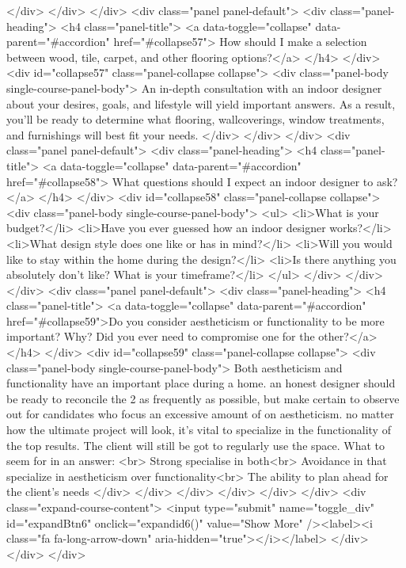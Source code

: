 {</div>
</div>
</div>
<div class="panel panel-default">
<div class="panel-heading">
<h4 class="panel-title">
<a data-toggle="collapse" data-parent="#accordion" href="#collapse57"> How should I make a selection between wood, tile, carpet, and other flooring options?</a>
</h4>
</div>
<div id="collapse57" class="panel-collapse collapse">
<div class="panel-body single-course-panel-body">
An in-depth consultation with an indoor designer about your desires, goals, and lifestyle will yield important answers. As a result, you'll be ready to determine what flooring, wallcoverings, window treatments, and furnishings will best fit your needs.
</div>
</div>
</div>
<div class="panel panel-default">
<div class="panel-heading">
<h4 class="panel-title">
<a data-toggle="collapse" data-parent="#accordion" href="#collapse58"> What questions should I expect an indoor designer to ask?</a>
</h4>
</div>
<div id="collapse58" class="panel-collapse collapse">
<div class="panel-body single-course-panel-body">
<ul>
<li>What is your budget?</li>
<li>Have you ever guessed how an indoor designer works?</li>
<li>What design style does one like or has in mind?</li>
<li>Will you would like to stay within the home during the design?</li>
<li>Is there anything you absolutely don't like?
What is your timeframe?</li>
</ul>
</div>
</div>
</div>
<div class="panel panel-default">
<div class="panel-heading">
<h4 class="panel-title">
<a data-toggle="collapse" data-parent="#accordion" href="#collapse59">Do you consider aestheticism or functionality to be more important? Why? Did you ever need to compromise one for the other?</a>
</h4>
</div>
<div id="collapse59" class="panel-collapse collapse">
<div class="panel-body single-course-panel-body">
Both aestheticism and functionality have an important place during a home. an honest designer should be ready to reconcile the 2 as frequently as possible, but make certain to observe out for candidates who focus an excessive amount of on aestheticism. no matter how the ultimate project will look, it's vital to specialize in the functionality of the top results. The client will still be got to regularly use the space. What to seem for in an answer:
<br>
Strong specialise in both<br>
Avoidance in that specialize in aestheticism over functionality<br>
The ability to plan ahead for the client's needs
</div>
</div>
</div>
</div>
</div>
</div>
<div class="expand-course-content">
<input type="submit" name="toggle_div" id="expandBtn6" onclick="expandid6()" value="Show More" /><label><i class="fa fa-long-arrow-down" aria-hidden="true"></i></label>
</div>
</div>
</div>
}
